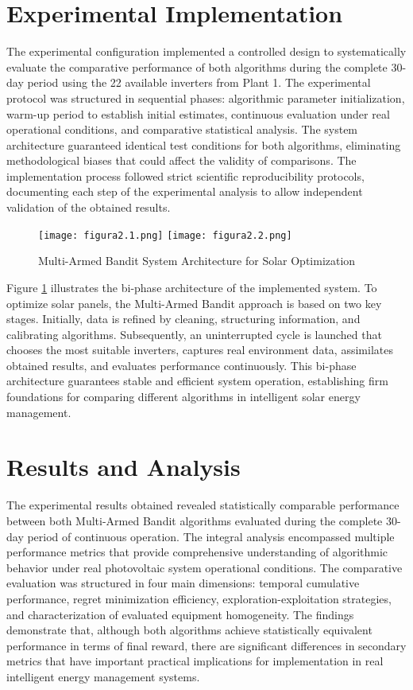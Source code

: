 \documentclass[conference]{IEEEtran}
\begin{document}
\section{Experimental Implementation}

The experimental configuration implemented a controlled design to systematically evaluate the comparative performance of both algorithms during the complete 30-day period using the 22 available inverters from Plant 1. The experimental protocol was structured in sequential phases: algorithmic parameter initialization, warm-up period to establish initial estimates, continuous evaluation under real operational conditions, and comparative statistical analysis. The system architecture guaranteed identical test conditions for both algorithms, eliminating methodological biases that could affect the validity of comparisons. The implementation process followed strict scientific reproducibility protocols, documenting each step of the experimental analysis to allow independent validation of the obtained results.

\begin{figure}[H]
\centering
\texttt{[image: figura2.1.png]}
\texttt{[image: figura2.2.png]}
\caption{Multi-Armed Bandit System Architecture for Solar Optimization}
\label{fig:flowchart}
\end{figure}

Figure \ref{fig:flowchart} illustrates the bi-phase architecture of the implemented system. To optimize solar panels, the Multi-Armed Bandit approach is based on two key stages. Initially, data is refined by cleaning, structuring information, and calibrating algorithms. Subsequently, an uninterrupted cycle is launched that chooses the most suitable inverters, captures real environment data, assimilates obtained results, and evaluates performance continuously. This bi-phase architecture guarantees stable and efficient system operation, establishing firm foundations for comparing different algorithms in intelligent solar energy management.

\section{Results and Analysis}

The experimental results obtained revealed statistically comparable performance between both Multi-Armed Bandit algorithms evaluated during the complete 30-day period of continuous operation. The integral analysis encompassed multiple performance metrics that provide comprehensive understanding of algorithmic behavior under real photovoltaic system operational conditions. The comparative evaluation was structured in four main dimensions: temporal cumulative performance, regret minimization efficiency, exploration-exploitation strategies, and characterization of evaluated equipment homogeneity. The findings demonstrate that, although both algorithms achieve statistically equivalent performance in terms of final reward, there are significant differences in secondary metrics that have important practical implications for implementation in real intelligent energy management systems.
\end{document}
